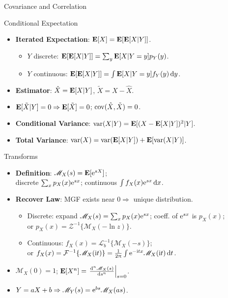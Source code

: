 \documentclass[landscape,a4paper]{article}
\begin{document}
\begin{cheatsheetcolumns}
\begin{card}{Covariance and Correlation}
\begin{itemize}
			\end{itemize}
		\end{card}
		\begin{card}{Conditional Expectation}
			\begin{itemize}
				\item \textbf{Iterated Expectation}: $\mathbf{E}[X]=\mathbf{E}[\mathbf{E}[X|Y]]$.
				\begin{itemize}
					\item $Y$ discrete: $\mathbf{E}[\mathbf{E}[X|Y]]=\sum_y\mathbf{E}[X|Y=y]p_Y(y)$.
					\item $Y$ continuous: $\mathbf{E}[\mathbf{E}[X|Y]]=\int\mathbf{E}[X|Y=y]f_Y(y)\,\mathrm dy$.
				\end{itemize}
				\item \textbf{Estimator}: $\hat X=\mathbf{E}[X|Y]$, $\tilde X=X-\hat X$.
				\item $\mathbf{E}[\tilde X|Y]=0\Rightarrow\mathbf{E}[\tilde X]=0$; $\operatorname{cov}(\hat X,\tilde X)=0$.
				\item \textbf{Conditional Variance}: $\operatorname{var}(X|Y)=\mathbf{E}[(X-\mathbf{E}[X|Y])^2|Y]$.
				\item \textbf{Total Variance}: $\operatorname{var}(X)=\operatorname{var}(\mathbf{E}[X|Y])+\mathbf{E}[\operatorname{var}(X|Y)]$.
			\end{itemize}
		\end{card}
		\begin{card}{Transforms}
			\begin{itemize}
				\item \textbf{Definition}: $\mathscr{M}_X(s)=\mathbf{E}[\mathrm{e}^{sX}]$;\\ discrete $\sum_xp_X(x)\mathrm{e}^{sx}$; continuous $\int f_X(x)\mathrm{e}^{sx}\,\mathrm dx$.
				\item \textbf{Recover Law}: MGF exists near $0\Rightarrow$ unique distribution.
				\begin{itemize}
					\item Discrete: expand $\mathscr{M}_X(s)=\sum_xp_X(x)\mathrm{e}^{sx}$; coeff. of $\mathrm{e}^{sx}$ is $p_X(x)$;\\ or $p_X(x)=\mathcal Z^{-1}\{\mathscr{M}_X(-\ln z)\}$.
					\item Continuous: $f_X(x)=\mathcal L_b^{-1}\{\mathscr{M}_X(-s)\}$;\\ or $f_X(x)=\mathcal F^{-1}\{\mathscr{M}_X(\mathrm{i} t)\}=\frac1{2\uppi}\int\mathrm{e}^{-\mathrm{i} tx}\mathscr{M}_X(\mathrm{i} t)\,\mathrm dt$.
				\end{itemize}
				\item $\mathscr{M}_X(0)=1$; $\EE[X^n]=\left.\odv[n]{\mathscr{M}_X(s)}{s}\right|_{s=0}$.
				\item $Y=aX+b\Rightarrow\mathscr{M}_Y(s)=\mathrm{e}^{bs}\mathscr{M}_X(as)$.

\end{itemize}
\end{card}
\end{cheatsheetcolumns}
\end{document}
